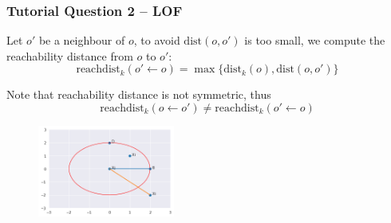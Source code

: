 \documentclass[aspectratio=169, 10pt]{beamer}
\begin{document}
\begin{frame}
    \frametitle{Tutorial Question 2 -- LOF}

    Let $o'$ be a neighbour of $o$, to avoid $\text{dist}(o, o')$ is too small, we compute the reachability distance from $o$ to $o'$:
    \[
        \text{reachdist}_k(o' \leftarrow o) = \max\{\text{dist}_k(o), \text{dist}(o, o')\}
    \]
    
    Note that reachability distance is not symmetric, thus 
    \[
        \text{reachdist}_k(o \leftarrow o') \neq \text{reachdist}_k(o' \leftarrow o)
    \]

    \begin{figure}
        \centering
        \includegraphics[width=0.4\textwidth]{../imgs/reachdist.png}
    \end{figure}

\end{frame}
\end{document}
